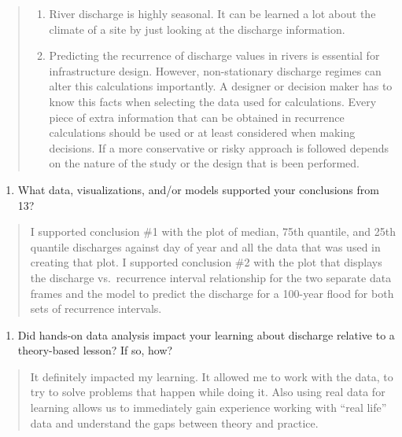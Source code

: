 \documentclass[]{article}
\providecommand{\tightlist}{%
  \setlength{\itemsep}{0pt}\setlength{\parskip}{0pt}}
\begin{document}
\begin{quote}
\begin{enumerate}
\def\labelenumi{\arabic{enumi}.}
\tightlist
\item
  River discharge is highly seasonal. It can be learned a lot about the
  climate of a site by just looking at the discharge information.
\item
  Predicting the recurrence of discharge values in rivers is essential
  for infrastructure design. However, non-stationary discharge regimes
  can alter this calculations importantly. A designer or decision maker
  has to know this facts when selecting the data used for calculations.
  Every piece of extra information that can be obtained in recurrence
  calculations should be used or at least considered when making
  decisions. If a more conservative or risky approach is followed
  depends on the nature of the study or the design that is been
  performed.
\end{enumerate}
\end{quote}

\begin{enumerate}
\def\labelenumi{\arabic{enumi}.}
\setcounter{enumi}{13}
\tightlist
\item
  What data, visualizations, and/or models supported your conclusions
  from 13?
\end{enumerate}

\begin{quote}
I supported conclusion \#1 with the plot of median, 75th quantile, and
25th quantile discharges against day of year and all the data that was
used in creating that plot. I supported conclusion \#2 with the plot
that displays the discharge vs.~recurrence interval relationship for the
two separate data frames and the model to predict the discharge for a
100-year flood for both sets of recurrence intervals.
\end{quote}

\begin{enumerate}
\def\labelenumi{\arabic{enumi}.}
\setcounter{enumi}{14}
\tightlist
\item
  Did hands-on data analysis impact your learning about discharge
  relative to a theory-based lesson? If so, how?
\end{enumerate}

\begin{quote}
It definitely impacted my learning. It allowed me to work with the data,
to try to solve problems that happen while doing it. Also using real
data for learning allows us to immediately gain experience working with
``real life'' data and understand the gaps between theory and practice.
\end{quote}
\end{document}
